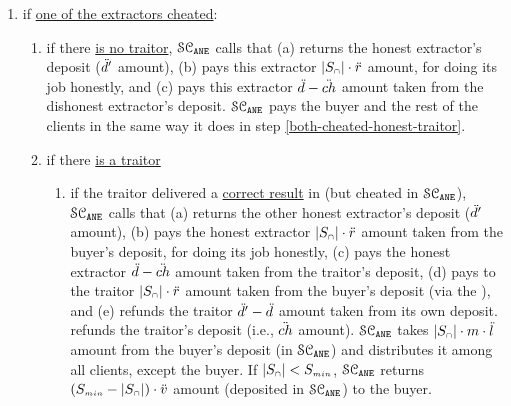 \begin{itemize}
\begin{enumerate}
\begin{enumerate}
\begin{enumerate}
%
\end{enumerate}
\end{enumerate}
%
\item if \underline{one of the extractors cheated}: 
%
\begin{enumerate}
%
\item if there \underline{is no traitor},  $\mathcal{SC}_{\mathtt{ANE}}$ calls \SCpc that (a) returns the honest extractor's deposit ($\ddot{d}'$ amount), (b) pays this extractor $|S_{\scriptscriptstyle\cap}|\cdot \ddot{r}$ amount, for doing its job honestly, and (c) pays this extractor $ \ddot{d}-\ddot{ch}$ amount taken from the dishonest extractor's deposit. 
%
%
%
 $\mathcal{SC}_{\mathtt{ANE}}$ pays the buyer and the rest of the clients in the same way it does in step \ref{both-cheated-honest-traitor}. 


%
\item if there \underline{is a traitor}
%


\begin{enumerate}
%
\item\label{one-cheated-exists-traitor-honest-traitor}  if the traitor delivered a \underline{correct result} in \SCtc (but  cheated in $\mathcal{SC}_{\mathtt{ANE}}$),  $\mathcal{SC}_{\mathtt{ANE}}$ calls \SCpc that (a) returns the other honest extractor's deposit ($\ddot{d}'$ amount), (b) pays the honest extractor $|S_{\scriptscriptstyle\cap}|\cdot \ddot{r}$ amount taken from the buyer's deposit, for doing its job honestly,  (c) pays the honest extractor $\ddot{d}- \ddot{ch}$ amount taken from the traitor's deposit,  
%
%
 (d)
 pays to the traitor $|S_{\scriptscriptstyle\cap}|\cdot \ddot{r}$ amount taken from the buyer’s deposit (via the \SCtc), and (e) refunds the traitor $\ddot{d}'-\ddot{d}$ amount taken from its own deposit.  \SCtc refunds the traitor's deposit (i.e., $\ddot{ch}$ amount).  $\mathcal{SC}_{\mathtt{ANE}}$ takes $|S_{\scriptscriptstyle\cap}|\cdot m\cdot \ddot{l}$ amount from the buyer's deposit (in $\mathcal{SC}_{\mathtt{ANE}}$) and distributes it among all clients, except the buyer. If $|{ { {S}}}_{\scriptscriptstyle\cap}|<S_{\scriptscriptstyle min}$,   $\mathcal{SC}_{\mathtt{ANE}}$ returns $(S_{\scriptscriptstyle min}-|{ { {S}}}_{\scriptscriptstyle\cap}|)\cdot \ddot{v}$ amount (deposited in $\mathcal{SC}_{\mathtt{ANE}}$)  to the buyer. 
 

\end{enumerate}
\end{enumerate}
\end{enumerate}
\end{itemize}
